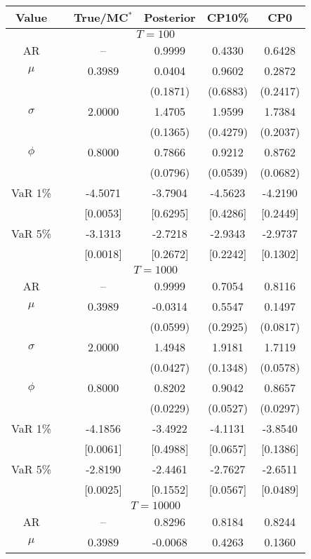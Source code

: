 { \renewcommand{\arraystretch}{1.2} 
\begin{table} 
\center 
\begin{tabular}{cc cccc} 
Value & & True/MC$^*$ & Posterior & CP10\% & CP0 \\ \hline 
\hline 
\multicolumn{6}{c}{$T =100$}  \\ 
\hline 
AR && -- & 0.9999 & 0.4330 & 0.6428  \\  
$\mu$&& 0.3989 & 0.0404 & 0.9602 & 0.2872  \\ 
&&   & (0.1871) & (0.6883) & (0.2417)  \\ 
$\sigma$&& 2.0000 & 1.4705 & 1.9599 & 1.7384  \\ 
&&   & (0.1365) & (0.4279) & (0.2037)  \\ 
$\phi$&& 0.8000 & 0.7866 & 0.9212 & 0.8762  \\ 
&&   & (0.0796) & (0.0539) & (0.0682)  \\ 
VaR 1\% && -4.5071 & -3.7904 & -4.5623 & -4.2190  \\ 
  && [0.0053] & [0.6295] & [0.4286] & [0.2449]  \\ 
VaR 5\% && -3.1313 & -2.7218 & -2.9343 & -2.9737  \\ 
 && [0.0018] & [0.2672] & [0.2242] & [0.1302]  \\ 
\hline 
\multicolumn{6}{c}{$T =1000$}  \\ 
\hline 
AR && -- & 0.9999 & 0.7054 & 0.8116  \\  
$\mu$&& 0.3989 & -0.0314 & 0.5547 & 0.1497  \\ 
&&   & (0.0599) & (0.2925) & (0.0817)  \\ 
$\sigma$&& 2.0000 & 1.4948 & 1.9181 & 1.7119  \\ 
&&   & (0.0427) & (0.1348) & (0.0578)  \\ 
$\phi$&& 0.8000 & 0.8202 & 0.9042 & 0.8657  \\ 
&&   & (0.0229) & (0.0527) & (0.0297)  \\ 
VaR 1\% && -4.1856 & -3.4922 & -4.1131 & -3.8540  \\ 
  && [0.0061] & [0.4988] & [0.0657] & [0.1386]  \\ 
VaR 5\% && -2.8190 & -2.4461 & -2.7627 & -2.6511  \\ 
 && [0.0025] & [0.1552] & [0.0567] & [0.0489]  \\ 
\hline 
\multicolumn{6}{c}{$T =10000$}  \\ 
\hline 
AR && -- & 0.8296 & 0.8184 & 0.8244  \\  
$\mu$&& 0.3989 & -0.0068 & 0.4263 & 0.1360  \\ 

\end{tabular}
\end{table}}
